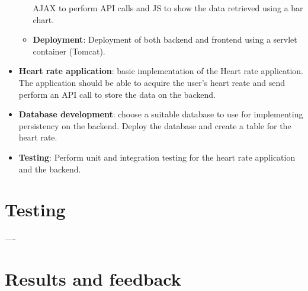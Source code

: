 \begin{itemize}
\begin{itemize}
			AJAX to perform API calls and JS to show the data retrieved using a bar chart.
		\item \textbf{Deployment}:
			Deployment of both backend and frontend using a servlet container (Tomcat).
	\end{itemize}
	\item \textbf{Heart rate application}:
		basic implementation of the Heart rate application. The application should be able to acquire
		the user's heart reate and send perform an API call to store the data on the backend.
	\item \textbf{Database development}:
		choose a suitable database to use for implementing persistency on the backend.
		Deploy the database and create a table for the heart rate.
	\item \textbf{Testing}:
		Perform unit and integration testing for the heart rate application and the backend.
\end{itemize}

\section{Testing}

----

\section{Results and feedback}

